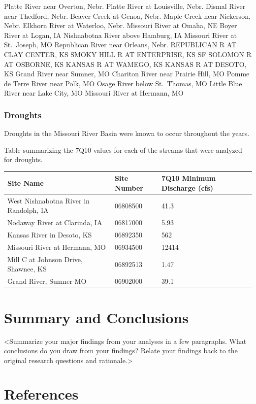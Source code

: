 \documentclass[12pt,]{article}
\begin{document}
Platte River near Overton, Nebr. Platte River at Louisville, Nebr.
Dismal River near Thedford, Nebr. Beaver Creek at Genoa, Nebr. Maple
Creek near Nickerson, Nebr. Elkhorn River at Waterloo, Nebr. Missouri
River at Omaha, NE Boyer River at Logan, IA Nishnabotna River above
Hamburg, IA Missouri River at St.~Joseph, MO Republican River near
Orleans, Nebr. REPUBLICAN R AT CLAY CENTER, KS SMOKY HILL R AT
ENTERPRISE, KS SF SOLOMON R AT OSBORNE, KS KANSAS R AT WAMEGO, KS KANSAS
R AT DESOTO, KS Grand River near Sumner, MO Chariton River near Prairie
Hill, MO Pomme de Terre River near Polk, MO Osage River below
St.~Thomas, MO Little Blue River near Lake City, MO Missouri River at
Hermann, MO

\hypertarget{droughts}{%
\subsubsection{Droughts}\label{droughts}}

Droughts in the Missouri River Basin were known to occur throughout the
years.

Table summarizing the 7Q10 values for each of the streams that were
analyzed for droughts.

\begin{longtable}[]{@{}lll@{}}
\toprule
Site Name & Site Number & 7Q10 Minimum Discharge (cfs)\tabularnewline
\midrule
\endhead
West Nishnabotna River in Randolph, IA & 06808500 & 41.3\tabularnewline
Nodaway River at Clarinda, IA & 06817000 & 5.93\tabularnewline
Kansas River in Desoto, KS & 06892350 & 562\tabularnewline
Missouri River at Hermann, MO & 06934500 & 12414\tabularnewline
Mill C at Johnson Drive, Shawnee, KS & 06892513 & 1.47\tabularnewline
Grand River, Sumner MO & 06902000 & 39.1\tabularnewline
\bottomrule
\end{longtable}

\newpage

\hypertarget{summary-and-conclusions}{%
\section{Summary and Conclusions}\label{summary-and-conclusions}}

\textless{}Summarize your major findings from your analyses in a few
paragraphs. What conclusions do you draw from your findings? Relate your
findings back to the original research questions and
rationale.\textgreater{}

\newpage

\hypertarget{references}{%
\section*{References}\label{references}}
\end{document}
